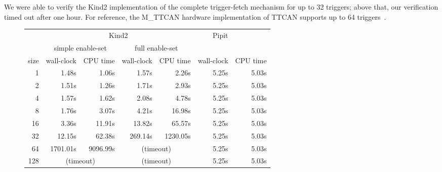 We were able to verify the Kind2 implementation of the complete trigger-fetch mechanism for up to 32 triggers; above that, our verification timed out after one hour.
For reference, the M_TTCAN hardware implementation of TTCAN supports up to 64 triggers~\cite{bosch2019mttcan}.


\begin{figure}
  \center
\begin{tabular}{r|rr|rr|rr}
  & \multicolumn{4}{c|}{Kind2} & Pipit \\
  & \multicolumn{2}{c|}{simple enable-set} & \multicolumn{2}{c|}{full enable-set} & \\
  size & wall-clock & CPU time & wall-clock & CPU time & wall-clock & CPU time \\
  \hline
  
 1 & 1.48s&1.06s
 & 1.57s&2.26s
 & 5.25s&5.03s \\
 2 & 1.51s&1.26s
 & 1.71s&2.93s
 & 5.25s&5.03s \\
 4 & 1.57s&1.62s
 & 2.08s&4.78s
 & 5.25s&5.03s \\
 8 & 1.76s&3.07s
 & 4.21s&16.98s
 & 5.25s&5.03s \\
 16 & 3.36s&11.91s
 & 13.82s&65.57s
 & 5.25s&5.03s \\
 32 & 12.15s&62.38s
 & 269.14s&1230.05s
 & 5.25s&5.03s \\
 64 & 1701.01s&9096.99s
 &  \multicolumn{2}{c|}{(timeout)}  & 5.25s&5.03s \\
 128 &  \multicolumn{2}{c|}{(timeout)}  &  \multicolumn{2}{c|}{(timeout)}  & 5.25s&5.03s \\





\end{tabular}
\end{figure}
